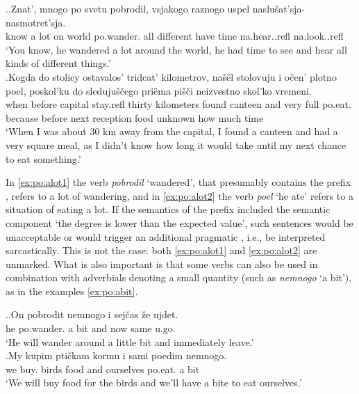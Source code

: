 \ex.\label{ex:po:alot}\ag.\label{ex:po:alot1}Znat', mnogo po svetu pobrodil, vsjakogo raznogo uspel {naslu\v{s}at'sja-} {nasmotret'sja.}\\
know {a lot} on world po.wander. all different {have time} na.hear..refl na.look..refl\\
\trans `You know, he wandered a lot around the world, he had time to see and hear all kinds of different things.'\\
\bg.\label{ex:po:alot2}Kogda do stolicy ostavalos' tridcat' kilometrov, na\v{s}\"{e}l stolovuju i o\v{c}en' plotno poel, poskol'ku do sleduju\v{s}\v{c}ego pri\"{e}ma pi\v{s}\v{c}i neizvestno skol'ko vremeni.\\
when before capital stay.refl thirty kilometers found canteen and very full po.eat. because before next reception food unknown {how much} time\\
\trans `When I was about 30 km away from the capital, I found a canteen and had a very square meal, as I didn't know how long it would take until my next chance to eat something.'\\

In \ref{ex:po:alot1} the verb \textit{pobrodil} `wandered', that presumably contains the  prefix , refers to a lot of wandering, and in \ref{ex:po:alot2} the verb \textit{poel} `he ate' refers to a situation of eating a lot. If the semantics of the  prefix  included the semantic component `the degree is lower than the expected value', such sentences would be unacceptable or would trigger an additional pragmatic , i.e., be interpreted sarcastically. This is not the case: both \ref{ex:po:alot1} and \ref{ex:po:alot2} are unmarked. What is also important is that some verbs can also be used in combination with adverbials denoting a small quantity (such as \textit{nemnogo} `a bit'), as in the examples \ref{ex:po:abit}.

\ex.\label{ex:po:abit}\ag.On pobrodit nemnogo i sej\v{c}as \v{z}e ujdet.\\
he po.wander. {a bit} and now same u.go.\\
\trans `He will wander around a little bit and immediately leave.'\\
\bg.My kupim pti\v{c}kam kormu i sami poedim nemnogo.\\
we buy. birds food and ourselves po.eat. {a bit}\\
\trans `We will buy food for the birds and we'll have a bite to eat ourselves.'\\

